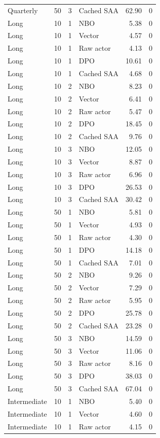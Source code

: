 \begin{longtable}{llrlrr}
Quarterly & 50 & 3 & Cached SAA & 62.90 & 0 \\
Long & 10 & 1 & NBO & 5.38 & 0 \\
Long & 10 & 1 & Vector & 4.57 & 0 \\
Long & 10 & 1 & Raw actor & 4.13 & 0 \\
Long & 10 & 1 & DPO & 10.61 & 0 \\
Long & 10 & 1 & Cached SAA & 4.68 & 0 \\
Long & 10 & 2 & NBO & 8.23 & 0 \\
Long & 10 & 2 & Vector & 6.41 & 0 \\
Long & 10 & 2 & Raw actor & 5.47 & 0 \\
Long & 10 & 2 & DPO & 18.45 & 0 \\
Long & 10 & 2 & Cached SAA & 9.76 & 0 \\
Long & 10 & 3 & NBO & 12.05 & 0 \\
Long & 10 & 3 & Vector & 8.87 & 0 \\
Long & 10 & 3 & Raw actor & 6.96 & 0 \\
Long & 10 & 3 & DPO & 26.53 & 0 \\
Long & 10 & 3 & Cached SAA & 30.42 & 0 \\
Long & 50 & 1 & NBO & 5.81 & 0 \\
Long & 50 & 1 & Vector & 4.93 & 0 \\
Long & 50 & 1 & Raw actor & 4.30 & 0 \\
Long & 50 & 1 & DPO & 14.18 & 0 \\
Long & 50 & 1 & Cached SAA & 7.01 & 0 \\
Long & 50 & 2 & NBO & 9.26 & 0 \\
Long & 50 & 2 & Vector & 7.29 & 0 \\
Long & 50 & 2 & Raw actor & 5.95 & 0 \\
Long & 50 & 2 & DPO & 25.78 & 0 \\
Long & 50 & 2 & Cached SAA & 23.28 & 0 \\
Long & 50 & 3 & NBO & 14.59 & 0 \\
Long & 50 & 3 & Vector & 11.06 & 0 \\
Long & 50 & 3 & Raw actor & 8.16 & 0 \\
Long & 50 & 3 & DPO & 38.03 & 0 \\
Long & 50 & 3 & Cached SAA & 67.04 & 0 \\
Intermediate & 10 & 1 & NBO & 5.40 & 0 \\
Intermediate & 10 & 1 & Vector & 4.60 & 0 \\
Intermediate & 10 & 1 & Raw actor & 4.15 & 0 \\

\end{longtable}
